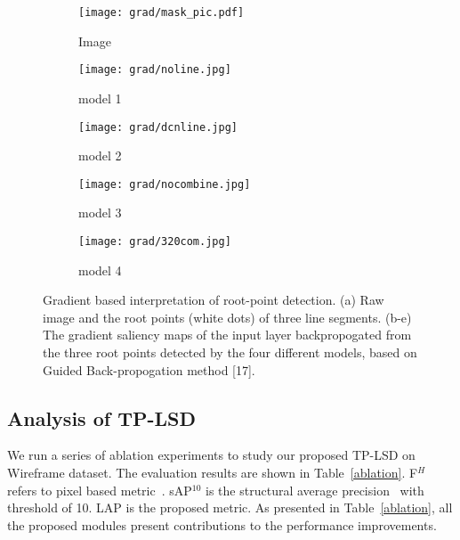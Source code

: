 \documentclass[runningheads]{llncs}
\begin{document}
\begin{figure}[t]
    \begin{center}
     \begin{subfigure}[b]{0.19\textwidth}
         \centering
         \texttt{[image: grad/mask\_pic.pdf]}
         \caption{Image}
         \label{sub_fig:image}
     \end{subfigure}
     \begin{subfigure}[b]{0.19\textwidth}
         \centering
         \texttt{[image: grad/noline.jpg]}
         \caption{model 1}
         \label{sub_fig:noline}
     \end{subfigure}
     \begin{subfigure}[b]{0.19\textwidth}
         \centering
         \texttt{[image: grad/dcnline.jpg]}
         \caption{model 2}
         \label{sub_fig:withline}
     \end{subfigure}
     \begin{subfigure}[b]{0.19\textwidth}
         \centering
         \texttt{[image: grad/nocombine.jpg]}
         \caption{model 3}
         \label{sub_fig:withFAM}
     \end{subfigure}
     \begin{subfigure}[b]{0.19\textwidth}
         \centering
         \texttt{[image: grad/320com.jpg]}
         \caption{model 4}
         \label{sub_fig:withMixConv}
     \end{subfigure}
   \end{center}
    \caption{Gradient based interpretation of root-point detection. (a) Raw image and the root points (white dots) of three line segments. (b-e) The gradient saliency maps of the input layer backpropogated from the three root points detected by the four different models, based on Guided Back-propogation method [17].}
    \label{grad}
\end{figure}

\subsection{Analysis of TP-LSD}
\label{ablationstudy}
We run a series of ablation experiments to
study our proposed TP-LSD on Wireframe dataset. The evaluation results are shown in Table~\ref{ablation}. F$^H$ refers to pixel based metric~\cite{Wireframe}. sAP$^{10}$ is the structural average precision~\cite{LCNN} with threshold of 10. LAP is the proposed metric. As presented in Table~\ref{ablation}, all the proposed modules present contributions to the performance improvements.
\end{document}
